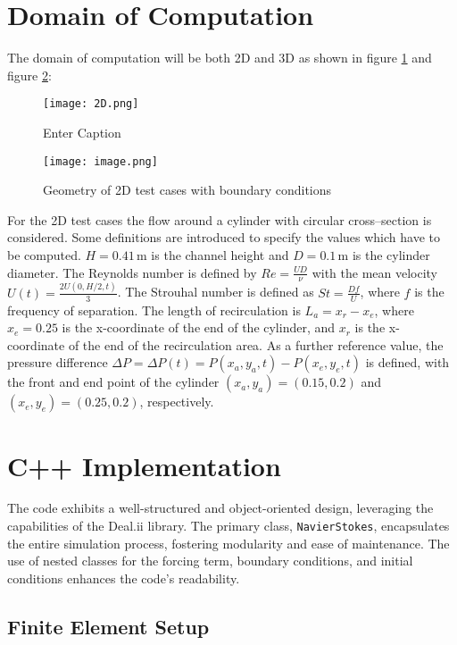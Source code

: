 \documentclass{article}
\begin{document}
\section{Domain of Computation}
The domain of computation will be both 2D and 3D as shown in figure \ref{fig:2D} and figure \ref{fig:3D}:
\begin{figure}
    \centering
    \texttt{[image: 2D.png]}
    \caption{Enter Caption}
    \label{fig:2D}
\end{figure}
\begin{figure}[h]
    \centering
    \texttt{[image: image.png]}
    \caption{Geometry of 2D test cases with boundary conditions}
    \label{fig:3D}
\end{figure}
For the 2D test cases the flow around a cylinder with circular cross–section is considered.
Some definitions are introduced to specify the values which have to be computed. $H = 0.41 \, \text{m}$ is the channel height and $D = 0.1 \, \text{m}$ is the cylinder diameter. The Reynolds number is defined by $Re = \frac{UD}{\nu}$ with the mean velocity $U(t) = \frac{2U(0, H/2, t)}{3}$. 
The Strouhal number is defined as $St = \frac{Df}{U}$, where $f$ is the frequency of separation. The length of recirculation is $L_a = x_r - x_e$, where $x_e = 0.25$ is the x-coordinate of the end of the cylinder, and $x_r$ is the x-coordinate of the end of the recirculation area. As a further reference value, the pressure difference $\Delta P = \Delta P(t) = P(x_a, y_a, t) - P(x_e, y_e, t)$ is defined, with the front and end point of the cylinder $(x_a, y_a) = (0.15, 0.2)$ and $(x_e, y_e) = (0.25, 0.2)$, respectively.

\section{C++ Implementation}

The code exhibits a well-structured and object-oriented design, leveraging the capabilities of the Deal.ii library. The primary class, \texttt{NavierStokes}, encapsulates the entire simulation process, fostering modularity and ease of maintenance. The use of nested classes for the forcing term, boundary conditions, and initial conditions enhances the code's readability.

\subsection{Finite Element Setup}
\end{document}
